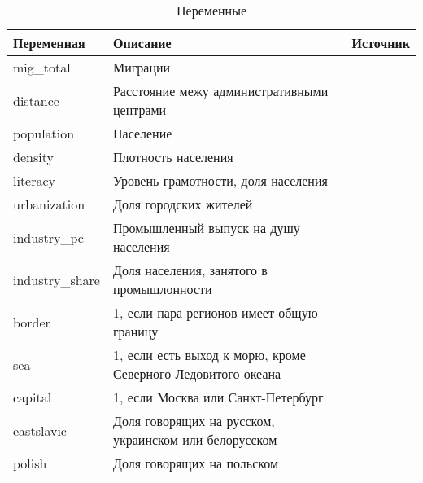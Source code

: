 \begin{longtable}{p{} p{} p{}}
	\caption{Переменные}\\
	\toprule
	Переменная     & Описание                                                     & Источник                         \\* \midrule
	\endfirsthead
	\endhead
	\bottomrule
	\endfoot
	\endlastfoot
	mig\_total      & Миграции                                                     & \cite{census_1897}               \\
	distance        & Расстояние межу административными центрами                   & \cite{geohack}                   \\
	population      & Население                                                    & \cite{ristat_2020}               \\
	density         & Плотность населения                                          &                                  \\
	literacy        & Уровень грамотности, доля населения                          &                                  \\
	urbanization    & Доля городских жителей                                       &                                  \\
	industry\_pc    & Промышленный выпуск на душу населения                        &                                  \\
	industry\_share & Доля населения, занятого в промышлонности                    & \cite{global}                    \\
	border          & 1, если пара регионов имеет общую границу                    & \cite{sablin_transcultural_2018} \\
	sea             & 1, если есть выход к морю, кроме Северного Ледовитого океана &                                  \\
	capital         & 1, если Москва или Санкт-Петербург                           &                                  \\
	eastslavic      & Доля говорящих на русском, украинском или белорусском        &                                  \\
	polish          & Доля говорящих на польском                                   &                                  \\

\end{longtable}
